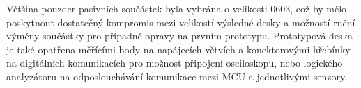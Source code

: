 Většina pouzder pasivních součástek byla vybrána o velikosti 0603, což by mělo poskytnout dostatečný kompromis mezi velikostí výsledné desky a možností ruční výměny součástky pro případné opravy na prvním prototypu. Prototypová deska je také opatřena měřícími body na napájecích větvích a konektorovými hřebínky na digitálních komunikacích pro možnost připojení osciloskopu, nebo logického analyzátoru na odposlouchávání komunikace mezi \ac{MCU} a jednotlivými senzory. 



